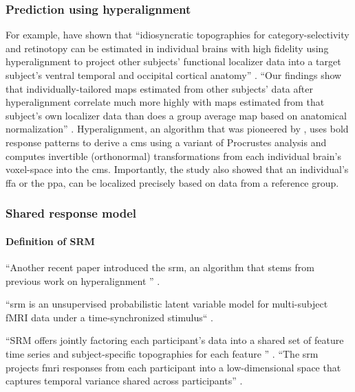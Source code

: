 \subsubsection{Prediction using hyperalignment}

%
For example, \citet{haxby2011common, guntupalli2016model} have shown that
``idiosyncratic topographies for category-selectivity and retinotopy can be
estimated in individual brains with high fidelity using hyperalignment to
project other subjects' functional localizer data into a target subject's
ventral temporal and occipital cortical anatomy'' \citep{jiahui2020predicting}.
%
``Our findings show that individually-tailored maps estimated from other
subjects’ data after hyperalignment correlate much more highly with maps
estimated from that subject's own localizer data than does a group average map
based on anatomical normalization'' \citep{jiahui2020predicting}.
%
Hyperalignment, an algorithm that was pioneered by \citet{haxby2011common}, uses
\ac{bold} response patterns to derive a \ac{cms} using a variant of Procrustes
analysis and computes invertible (orthonormal) transformations from each
individual brain's voxel-space into the \ac{cms}.
%
Importantly, the study also showed that an individual's \ac{ffa} or the
\ac{ppa}, can be localized precisely based on data from a reference group.


\subsubsection{Shared response model}

\paragraph{Definition of SRM}

``Another recent paper \citep{chen2015reduced} introduced the \ac{srm}, an algorithm that stems from previous work on hyperalignment
\citep{haxby2011common}'' \citep{vodrahalli2018mapping}.

``\ac{srm} \citep{chen2015reduced} is an unsupervised probabilistic latent
variable model for multi-subject fMRI data under a time-synchronized stimulus``
\citep{vodrahalli2018mapping}.

%
``SRM offers jointly factoring each participant's data into a shared set of
feature time series and subject-specific topographies for each feature ''
\citep{cohen2017computational}.
%
``The \ac{srm} \citep{chen2015reduced} projects \ac{fmri} responses from
each participant into a low-dimensional space that captures temporal variance
shared across participants'' \citep{cohen2017computational}.

